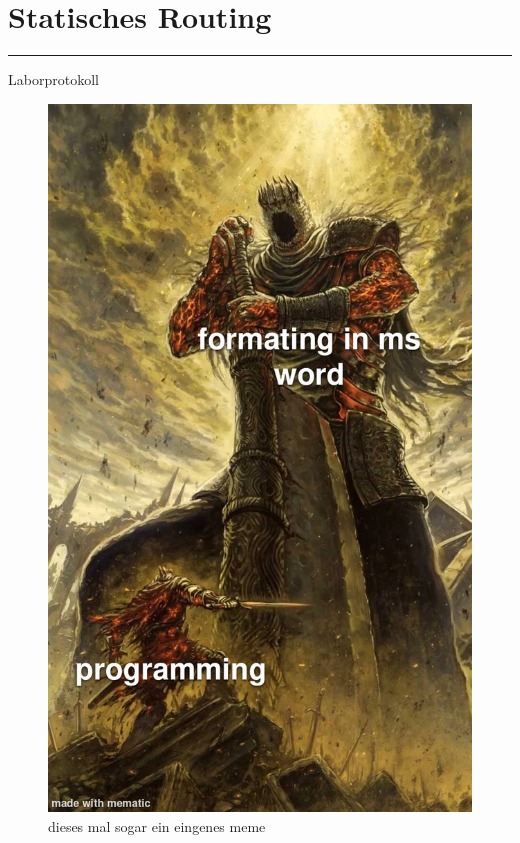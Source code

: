 \documentclass[a4paper]{article}
\begin{document}
\pagestyle{oida}
\section*{Statisches Routing}
\par\noindent\rule{\textwidth}{0.4pt}

Laborprotokoll

\begin{figure}[h]
	\centering
	\includegraphics[scale=0.35]{meme.jpeg}
	\caption{dieses mal sogar ein eingenes meme}
\end{figure}
\end{document}
